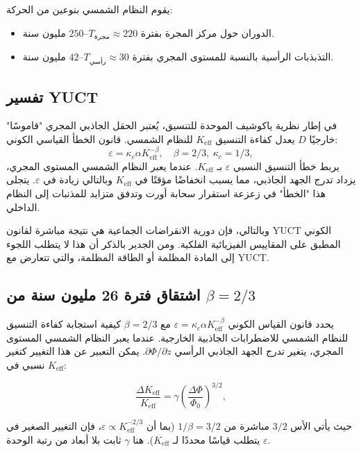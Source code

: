 \documentclass[11pt,a4paper]{article}
\begin{document}
	يقوم النظام الشمسي بنوعين من الحركة:
	\begin{itemize}
		\item الدوران حول مركز المجرة بفترة \(T_{\text{مجرة}} \approx 220\)–\(250\) مليون سنة.
		\item التذبذبات الرأسية بالنسبة للمستوى المجري بفترة \(T_{\text{رأسي}} \approx 30\)–\(42\) مليون سنة.
	\end{itemize}
	
	\subsection{تفسير YUCT}
	
	في إطار نظرية ياكوشيف الموحدة للتنسيق، يُعتبر الحقل الجاذبي المجري "قاموسًا" خارجيًا \(D\) يعدل كفاءة التنسيق \(K_{\mathrm{eff}}\) للنظام الشمسي. قانون الخطأ القياسي الكوني:
	\[
	\varepsilon = \kappa_c \alpha K_{\mathrm{eff}}^{-\beta},\quad \beta = 2/3,\ \kappa_c = 1/3,
	\]
	يربط خطأ التنسيق النسبي \(\varepsilon\) بـ \(K_{\mathrm{eff}}\). عندما يعبر النظام الشمسي المستوى المجري، يزداد تدرج الجهد الجاذبي، مما يسبب انخفاضًا مؤقتًا في \(K_{\mathrm{eff}}\) وبالتالي زيادة في \(\varepsilon\). يتجلى هذا "الخطأ" في زعزعة استقرار سحابة أورت وتدفق متزايد للمذنبات إلى النظام الداخلي.
	
	وبالتالي، فإن دورية الانقراضات الجماعية هي نتيجة مباشرة لقانون YUCT الكوني المطبق على المقاييس الفيزيائية الفلكية. ومن الجدير بالذكر أن هذا لا يتطلب اللجوء إلى المادة المظلمة أو الطاقة المظلمة، والتي تتعارض مع YUCT.
	
	\subsection{اشتقاق فترة 26 مليون سنة من $\beta = 2/3$}
	
	يحدد قانون القياس الكوني $\varepsilon = \kappa_c \alpha K_{\mathrm{eff}}^{-\beta}$ مع $\beta = 2/3$ كيفية استجابة كفاءة التنسيق للنظام الشمسي للاضطرابات الجاذبية الخارجية. عندما يعبر النظام الشمسي المستوى المجري، يتغير تدرج الجهد الجاذبي الرأسي $\partial \Phi / \partial z$. يمكن التعبير عن هذا التغيير كتغير نسبي في $K_{\mathrm{eff}}$:
	
	\[
	\frac{\Delta K_{\mathrm{eff}}}{K_{\mathrm{eff}}} = \gamma \left( \frac{\Delta \Phi}{\Phi_0} \right)^{3/2},
	\]
	
	حيث يأتي الأس $3/2$ مباشرة من $1/\beta = 3/2$ (بما أن $\varepsilon \propto K_{\mathrm{eff}}^{-2/3}$، فإن التغيير الصغير في $\varepsilon$ يتطلب قياسًا محددًا لـ $K_{\mathrm{eff}}$). هنا $\gamma$ ثابت بلا أبعاد من رتبة الوحدة.
	
\end{document}
